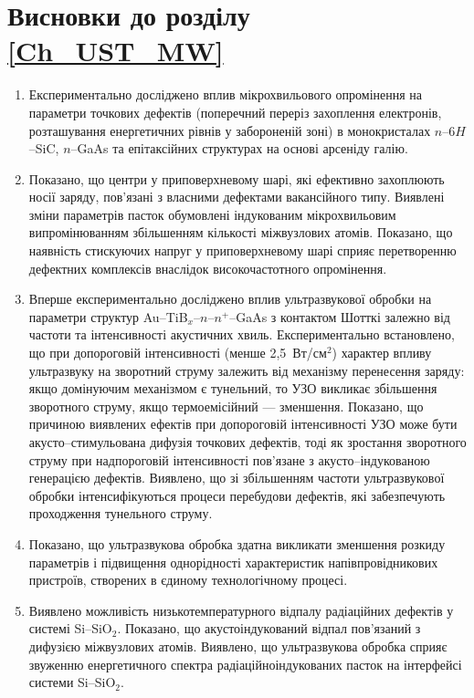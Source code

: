 \section*{Висновки до розділу \ref{Ch_UST_MW}}
  \begin{enumerate}[leftmargin=0cm,itemindent=3em]
\item Експериментально досліджено вплив мікрохвильового опромінення на параметри точкових дефектів (поперечний переріз захоплення електронів,
розташування енергетичних рівнів у забороненій зоні) в монокристалах $n$--6$H$--SiC, $n$--GaAs та епітаксійних структурах на основі арсеніду галію.


\item Показано, що  центри у приповерхневому шарі, які ефективно захоплюють носії заряду, пов'язані з власними дефектами вакансійного типу.
Виявлені зміни параметрів пасток обумовлені індукованим мікрохвильовим випромінюванням
збільшенням кількості міжвузлових атомів.
Показано, що наявність стискуючих напруг у приповерхневому шарі сприяє перетворенню дефектних комплексів внаслідок високочастотного опромінення.

     \item Вперше експериментально досліджено вплив ультразвукової обробки на параметри структур Au--TiB$_x$--$n$--$n^+$--GaAs з контактом Шотткі залежно від частоти та інтенсивності акустичних хвиль.
 Експериментально встановлено, що при допороговій інтенсивності (менше 2,5~Вт/см$^2$) характер впливу ультразвуку на зворотний струму залежить від механізму перенесення заряду:
  якщо домінуючим механізмом є тунельний, то УЗО викликає збільшення зворотного струму, якщо термоемісійний --- зменшення.
  Показано, що причиною  виявлених ефектів при допороговій інтенсивності УЗО
  може бути акусто--стимульована дифузія точкових дефектів, тоді як зростання зворотного струму при надпороговій  інтенсивності пов'язане з акусто--індукованою генерацією дефектів.
 Виявлено, що зі збільшенням частоти ультразвукової обробки інтенсифікуються процеси перебудови дефектів, які забезпечують проходження тунельного струму.

\item Показано, що ультразвукова обробка здатна викликати зменшення розкиду параметрів і підвищення однорідності характеристик напівпровідникових пристроїв, створених в єдиному технологічному процесі.

\item %
   Виявлено можливість низькотемпературного відпалу радіаційних дефектів у системі Si--SiO$_2$.
   Показано, що акустоіндукований відпал пов'язаний з дифузією міжвузлових атомів.
 Виявлено, що ультразвукова обробка сприяє звуженню енергетичного спектра радіаційноіндукованих пасток
на інтерфейсі системи    Si--SiO$_2$.


\end{enumerate}	



